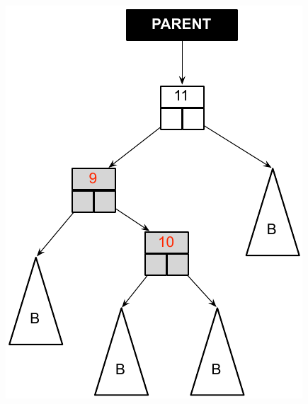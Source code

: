 \documentclass[12pt]{article}
\begin{document}
\begin{enumerate}
\includegraphics[scale=0.7]{images/RBT_2}

\end{enumerate}
\end{document}
